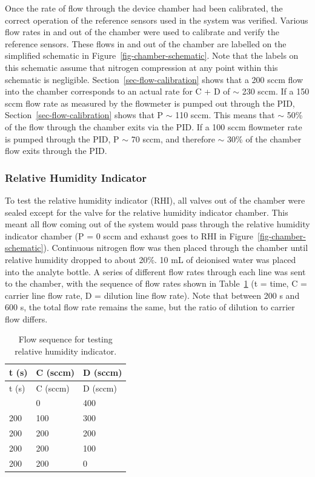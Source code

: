 \documentclass[
  a4paper,
]{scrbook}
\begin{document}
Once the rate of flow through the device chamber had been calibrated,
the correct operation of the reference sensors used in the system was
verified. Various flow rates in and out of the chamber were used to
calibrate and verify the reference sensors. These flows in and out of
the chamber are labelled on the simplified schematic in
Figure~\ref{fig-chamber-schematic}. Note that the labels on this
schematic assume that nitrogen compression at any point within this
schematic is negligible. Section~\ref{sec-flow-calibration} shows that a
200 sccm flow into the chamber corresponds to an actual rate for C + D
of \(\sim\) 230 sccm. If a 150 sccm flow rate as measured by the
flowmeter is pumped out through the PID,
Section~\ref{sec-flow-calibration} shows that P \(\sim\) 110 sccm. This
means that \(\sim\) 50\% of the flow through the chamber exits via the
PID. If a 100 sccm flowmeter rate is pumped through the PID, P \(\sim\)
70 sccm, and therefore \(\sim\) 30\% of the chamber flow exits through
the PID.

\hypertarget{relative-humidity-indicator}{%
\subsubsection*{Relative Humidity
Indicator}\label{relative-humidity-indicator}}

To test the relative humidity indicator (RHI), all valves out of the
chamber were sealed except for the valve for the relative humidity
indicator chamber. This meant all flow coming out of the system would
pass through the relative humidity indicator chamber (P = 0 sccm and
exhaust goes to RHI in Figure~\ref{fig-chamber-schematic}). Continuous
nitrogen flow was then placed through the chamber until relative
humidity dropped to about 20\%. 10 mL of deionised water was placed into
the analyte bottle. A series of different flow rates through each line
was sent to the chamber, with the sequence of flow rates shown in
Table~\ref{tbl-RHI-flow-sequence} (t = time, C = carrier line flow rate,
D = dilution line flow rate). Note that between 200 s and 600 s, the
total flow rate remains the same, but the ratio of dilution to carrier
flow differs.

\hypertarget{tbl-RHI-flow-sequence}{}
\begin{longtable}[]{@{}lll@{}}
\caption{\label{tbl-RHI-flow-sequence}Flow sequence for testing relative
humidity indicator.}\tabularnewline
\toprule\noalign{}
t (s) & C (sccm) & D (sccm) \\
\midrule\noalign{}
\endfirsthead
\toprule\noalign{}
t (s) & C (sccm) & D (sccm) \\
\midrule\noalign{}
\endhead
\bottomrule\noalign{}
\endlastfoot
200 & 0 & 400 \\
200 & 100 & 300 \\
200 & 200 & 200 \\
200 & 200 & 100 \\
200 & 200 & 0 \\
\end{longtable}
\end{document}
